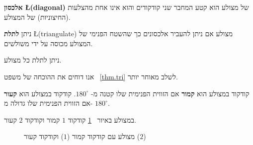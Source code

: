 \begin{definition}
\textbf{אלכסון \L{(diagonal)}}
של מצולע הוא קטע המחבר שני קודקודים והוא אינו אחת מהצלעות (החיצוניות) של המצולע.
\end{definition}
\begin{definition}
ניתן 
\textbf{לתלת}
\L{(triangulate)}
מצולע אם ניתן להעביר אלכסונים כך שהשטח הפנימי של המצולע מכוסה על ידי משולשים.
\end{definition}
\begin{theorem}\label{thm.tri}
ניתן לתלת כל מצולע.
\end{theorem}
אנו דוחים את ההוכחה של משפט%
~\ref{thm.tri}
לשלב מאוחר יותר.
\begin{definition}
קודקוד במצולע הוא 
\textbf{קמור}
אם הזווית הפנימית שלו קטנה מ-%
$180^\circ$.
קודקוד במצולע הוא
\textbf{קעור}
אם הזווית הפנימית שלו גדולה מ-%
$180^\circ$.

במצולע באיור%
~\ref{f.museum.arbitrary}
קודקוד 
$1$
קמור וקודקוד
$2$
קעור.
\end{definition}
\begin{figure}[tb]
\begin{center}
\end{center}
\caption{מצולע עם קודקוד קמור
($1$)
וקודקוד קעור
($2$)}\label{f.museum.arbitrary}
\end{figure}

